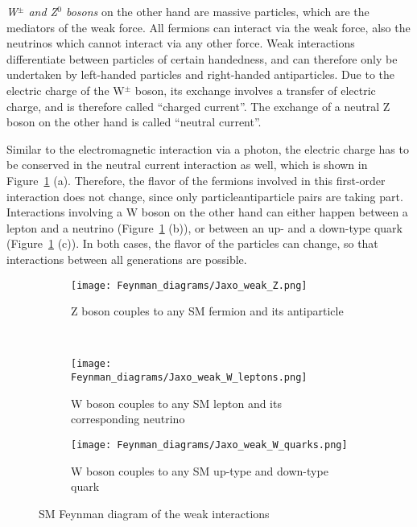 \begin{minipage}{0.55\textwidth}
\textit{W$^\pm$ and Z$^0$ bosons} on the other hand are massive particles, which are the mediators of the weak force.
All fermions can interact via the weak force, also the neutrinos which cannot interact via any other force.
Weak interactions differentiate between particles of certain handedness, and can therefore only be undertaken by left-handed particles and right-handed antiparticles.
Due to the electric charge of the W$^\pm$ boson, its exchange involves a transfer of electric charge, and is therefore called ``charged current''.
The exchange of a neutral Z boson on the other hand is called ``neutral current''.

Similar to the electromagnetic interaction via a photon, the electric charge has to be conserved in the neutral current interaction as well, which is shown in Figure~\ref{fig:Feynman:weak} (a).
Therefore, the flavor of the fermions involved in this first-order interaction does not change, since only particle\textendash antiparticle pairs are taking part.
Interactions involving a W boson on the other hand can either happen between a lepton and a neutrino (Figure~\ref{fig:Feynman:weak} (b)), or between an up- and a down-type quark (Figure~\ref{fig:Feynman:weak} (c)). 
In both cases, the flavor of the particles can change, so that interactions between all generations are possible.
\end{minipage} \hfill
\begin{minipage}{0.4\textwidth}
\centering
\begin{figure}[H]
\centering
\begin{subfigure}[b]{\textwidth}\centering
\texttt{[image: Feynman\_diagrams/Jaxo\_weak\_Z.png]}
\caption{Z boson couples to any SM fermion and its antiparticle}
\end{subfigure}\\
\begin{subfigure}[t]{0.48\textwidth}\centering
\texttt{[image: Feynman\_diagrams/Jaxo\_weak\_W\_leptons.png]}
\caption{W boson couples to any SM lepton and its corresponding neutrino}
\end{subfigure}\hfill
\begin{subfigure}[t]{0.48\textwidth}\centering
\texttt{[image: Feynman\_diagrams/Jaxo\_weak\_W\_quarks.png]}
\caption{W boson couples to any SM up-type and down-type quark}
\end{subfigure}
\caption{SM Feynman diagram of the weak interactions}
\label{fig:Feynman:weak} 
\end{figure}
\end{minipage}


